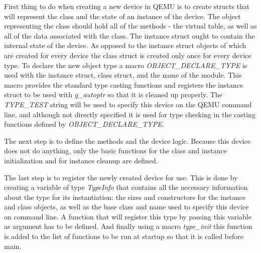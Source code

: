 First thing to do when creating a new device in QEMU is to create structs that
will represent the class and the state of an instance of the device. The object
representing the class should hold all of the methods - the virtual  table, as
well as all of the data associated with the class. The instance struct ought to
contain the internal state of the device. As opposed to the instance struct
objects of which are created for every device the class struct is created only
once for every device type. To declare the new object type a macro
\emph{OBJECT\_DECLARE\_TYPE} is used with the instance struct, class struct,
and the name of the module. This macro provides the standard type casting
functions and registers the instance struct to be used with \emph{g\_autoptr}
so that it is cleaned up properly. The \emph{TYPE\_TEST} string will be used to
specify this device on the QEMU command line, and although not directly
specified it is used for type checking in the casting functions defined by
\emph{OBJECT\_DECLARE\_TYPE}.

\begin{codeblock}
    
\end{codeblock}

The next step is to define the methods and the device logic. Because this
device does not do anything, only the basic functions for the class and instance
initialization and for instance cleanup are defined.

\begin{codeblock}
    
\end{codeblock}

The last step is to register the newly created device for use. This is done by
creating a variable of type \emph{TypeInfo} that contains all the necessary
information about the type for its instantiation: the sizes and constructors
for the instance and class objects, as well as the base class and name used to
specify this device on command line. A function that will register this type by
passing this variable as argument has to be defined. And finally using a macro
\emph{type\_init} this function is added to the list of functions to be run at
startup so that it is called before main.

\begin{codeblock}
    
\end{codeblock}

